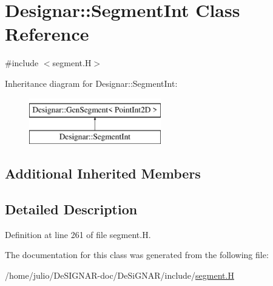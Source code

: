 \hypertarget{class_designar_1_1_segment_int}{}\section{Designar\+:\+:Segment\+Int Class Reference}
\label{class_designar_1_1_segment_int}


{\ttfamily \#include $<$segment.\+H$>$}

Inheritance diagram for Designar\+:\+:Segment\+Int\+:\begin{figure}[H]
\begin{center}
\leavevmode
\includegraphics[height=2.000000cm]{class_designar_1_1_segment_int}
\end{center}
\end{figure}
\subsection*{Additional Inherited Members}


\subsection{Detailed Description}


Definition at line 261 of file segment.\+H.



The documentation for this class was generated from the following file\+:\begin{DoxyCompactItemize}
\item 
/home/julio/\+De\+S\+I\+G\+N\+A\+R-\/doc/\+De\+Si\+G\+N\+A\+R/include/\hyperlink{segment_8_h}{segment.\+H}\end{DoxyCompactItemize}
